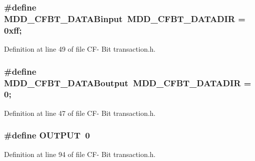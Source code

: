 \subsubsection[{M\+D\+D\+\_\+\+C\+F\+B\+T\+\_\+\+D\+A\+T\+A\+Binput}]{\setlength{\rightskip}{0pt plus 5cm}\#define M\+D\+D\+\_\+\+C\+F\+B\+T\+\_\+\+D\+A\+T\+A\+Binput~M\+D\+D\+\_\+\+C\+F\+B\+T\+\_\+\+D\+A\+T\+A\+D\+I\+R = 0xff;}\label{_c_f-_01_bit_01transaction_8h_aed5d608ab48cc40aca7d6981252d7c64}


Definition at line 49 of file C\+F-\/ Bit transaction.\+h.

\hypertarget{_c_f-_01_bit_01transaction_8h_a41fbe181036691e284ce0b3a6c66a996}{}
\subsubsection[{M\+D\+D\+\_\+\+C\+F\+B\+T\+\_\+\+D\+A\+T\+A\+Boutput}]{\setlength{\rightskip}{0pt plus 5cm}\#define M\+D\+D\+\_\+\+C\+F\+B\+T\+\_\+\+D\+A\+T\+A\+Boutput~M\+D\+D\+\_\+\+C\+F\+B\+T\+\_\+\+D\+A\+T\+A\+D\+I\+R = 0;}\label{_c_f-_01_bit_01transaction_8h_a41fbe181036691e284ce0b3a6c66a996}


Definition at line 47 of file C\+F-\/ Bit transaction.\+h.

\hypertarget{_c_f-_01_bit_01transaction_8h_a61a3c9a18380aafb6e430e79bf596557}{}
\subsubsection[{O\+U\+T\+P\+U\+T}]{\setlength{\rightskip}{0pt plus 5cm}\#define O\+U\+T\+P\+U\+T~0}\label{_c_f-_01_bit_01transaction_8h_a61a3c9a18380aafb6e430e79bf596557}


Definition at line 94 of file C\+F-\/ Bit transaction.\+h.

\hypertarget{_c_f-_01_bit_01transaction_8h_acc6fa55e6ee7e4b6adc5fdc8928b5dd9}{}
